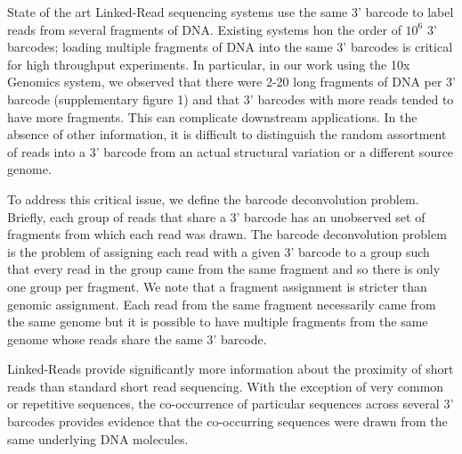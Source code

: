 State of the art Linked-Read sequencing systems use the same 3' barcode to label reads from several fragments of DNA. Existing systems hon the order of $10^6$ 3' barcodes; loading multiple fragments of DNA into the same 3' barcodes is critical for high throughput experiments. In particular, in our work using the 10x Genomics system, we observed that there were 2-20 long fragments of DNA per 3' barcode (supplementary figure 1) and that 3' barcodes with more reads tended to have more fragments. This can complicate downstream applications. In the absence of other information, it is difficult to distinguish the random assortment of reads into a 3' barcode from an actual structural variation or a different source genome.

To address this critical issue, we define the barcode deconvolution problem. Briefly, each group of reads that share a 3' barcode has an unobserved set of fragments from which each read was drawn. The barcode deconvolution problem is the problem of assigning each read with a given 3' barcode to a group such that every read in the group came from the same fragment and so there is only one group per fragment. We note that a fragment assignment is stricter than genomic assignment. Each read from the same fragment necessarily came from the same genome but it is possible to have multiple fragments from the same genome whose reads share the same 3' barcode.

Linked-Reads provide significantly more information about the proximity of short reads than standard short read sequencing. With the exception of very common or repetitive sequences, the co-occurrence of particular sequences across several 3' barcodes provides evidence that the co-occurring sequences were drawn from the same underlying DNA molecules.





